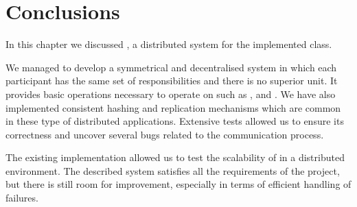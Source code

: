 \section{Conclusions}
    In this chapter we discussed \DHTS, a distributed system for the implemented \PHT class.
    
    We managed to develop a symmetrical and decentralised system in which each participant has the same set of responsibilities and there is no superior unit.
    It provides basic operations necessary to operate on \PHT such as \insertMethod, \getMethod and \removeMethod.
    We have also implemented consistent hashing and replication mechanisms which are common in these type of distributed applications.
    Extensive tests allowed us to ensure its correctness and uncover several bugs related to the communication process.

    The existing \DHTS implementation allowed us to test the scalability of \PHT in a distributed environment. The described system satisfies all the requirements of the project, but there is still room for improvement, especially in terms of efficient handling of failures.